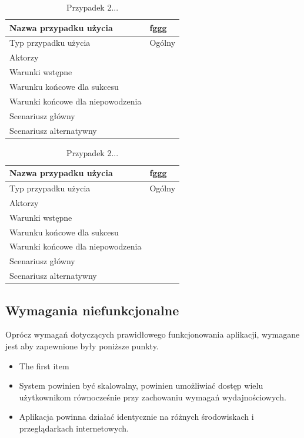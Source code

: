 \begin{table}[H]
    \centering
    \begin{tabular}{|l|l|}
    \hline
    Nazwa przypadku użycia & fggg  \\ \hline
    Typ przypadku użycia  & Ogólny  \\ \hline
    Aktorzy   & ~     \\ \hline
    Warunki wstępne   & ~     \\ \hline
    Warunku końcowe dla sukcesu   & ~     \\ \hline
    Warunki końcowe dla niepowodzenia   & ~     \\ \hline
    Scenariusz główny   & ~     \\ \hline
    Scenariusz alternatywny   & ~     \\ \hline
    \end{tabular}
    \caption{Przypadek 2...}
    \label{tab:caseuse2}
\end{table}

\begin{table}[H]
    \centering
    \begin{tabular}{|l|l|}
    \hline
    Nazwa przypadku użycia & fggg  \\ \hline
    Typ przypadku użycia  & Ogólny  \\ \hline
    Aktorzy   & ~     \\ \hline
    Warunki wstępne   & ~     \\ \hline
    Warunku końcowe dla sukcesu   & ~     \\ \hline
    Warunki końcowe dla niepowodzenia   & ~     \\ \hline
    Scenariusz główny   & ~     \\ \hline
    Scenariusz alternatywny   & ~     \\ \hline
    \end{tabular}
    \caption{Przypadek 2...}
    \label{tab:caseuse2}
\end{table}

\subsection{Wymagania niefunkcjonalne}
\label{sec:niefunkcjonalnes}

Oprócz wymagań dotyczących prawidłowego funkcjonowania aplikacji, wymagane jest
aby zapewnione były poniższe punkty.

\begin{itemize}
\item 
The first item

\item 
System powinien być skalowalny, powinien umożliwiać dostęp wielu użytkownikom równocześnie przy zachowaniu wymagań wydajnościowych.

\item
Aplikacja powinna działać identycznie na różnych środowiskach i przeglądarkach internetowych.
\end{itemize}